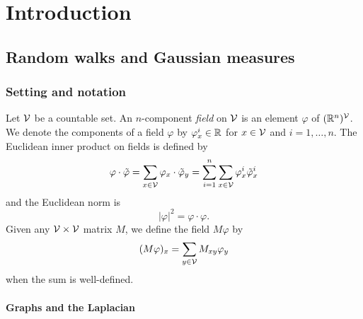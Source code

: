 
\chapter{Introduction}


\section{Random walks and Gaussian measures}


\subsection{Setting and notation}

Let $\mathcal{V}$ be a countable set. An $n$-component \emph{field} on $\mathcal{V}$
is an element $\varphi$ of $({\mathbb R}^n)^{\mathcal{V}}$.
We denote the components of a field $\varphi$
by $\varphi^i_x \in {\mathbb R}$ for $x \in \mathcal{V}$ and $i = 1, \ldots, n$.
The Euclidean inner product on fields is defined by
\begin{equation}
\varphi\cdot\tilde\varphi
  =
\sum_{x\in\mathcal{V}} \varphi_x \cdot \tilde\varphi_y
  =
\sum_{i=1}^n \sum_{x\in\mathcal{V}} \varphi^i_x \tilde\varphi^i_x
\end{equation}
and the Euclidean norm is
\begin{equation}
|\varphi|^2 = \varphi \cdot \varphi.
\end{equation}
Given any $\mathcal{V}\times\mathcal{V}$ matrix $M$, we define the field $M \varphi$ by
\begin{equation}
(M \varphi)_x = \sum_{y\in\mathcal{V}} M_{xy} \varphi_y
\end{equation}
when the sum is well-defined.

\subsubsection{Graphs and the Laplacian}

